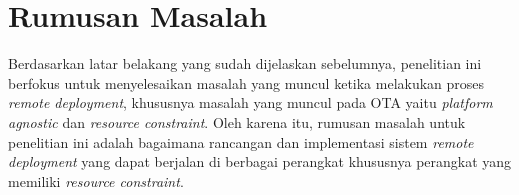 \section{Rumusan Masalah}

Berdasarkan latar belakang yang sudah dijelaskan sebelumnya, penelitian ini berfokus untuk menyelesaikan masalah yang muncul ketika melakukan proses \textit{remote deployment}, khususnya masalah yang muncul pada OTA yaitu \textit{platform agnostic} dan \textit{resource constraint}. Oleh karena itu, rumusan masalah untuk penelitian ini adalah bagaimana rancangan dan implementasi sistem \textit{remote deployment} yang dapat berjalan di berbagai perangkat khususnya perangkat yang memiliki \textit{resource constraint}.